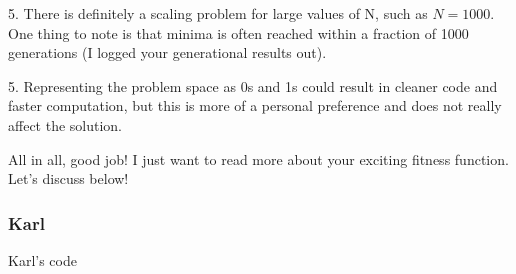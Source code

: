 5. There is definitely a scaling problem for large values of N, such as $N=1000$. One thing to note is that minima is often reached within a fraction of 1000 generations (I logged your generational results out).

5. Representing the problem space as 0s and 1s could result in cleaner code and faster computation, but this is more of a personal preference and does not really affect the solution.

All in all, good job! I just want to read more about your exciting fitness function. Let's discuss below!

\subsubsection{Karl}

Karl's code

